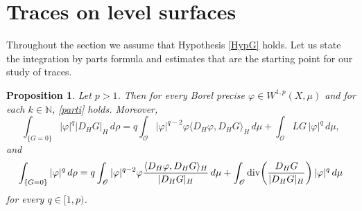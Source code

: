 \documentclass[reqno,twoside,12pt]{amsart}
\newtheorem{Proposition}[Theorem]{Proposition}
\begin{document}
\section{Traces on level surfaces}
\label{sect:traces}

Throughout the section we assume that Hypothesis \ref{HypG} holds. 
Let us state the integration by parts formula and estimates that are the starting point for our study of traces. 

 
 
\begin{Proposition}
\label{p5.1}
Let $p>1$. Then for every Borel precise  $\varphi\in W^{1,p}(X, \mu)$ and for each  $k\in {\mathbb N}$, \eqref{parti} holds. 
Moreover, 
\begin{equation}
\label{partitraccia}
  \int_{\{G=0\}} | \varphi|^q |D_HG|_H  \,d\rho  =  q   \int_{\mathcal O}  | \varphi|^{q-2}\varphi \langle D_H\varphi, D_HG\rangle_H   \,d\mu +  \int_{\mathcal O} LG \,| \varphi|^q \,d\mu , 
  \end{equation}
and 
\begin{equation}
\label{partitraccia2}
 \int_{\{G=0\}} | \varphi|^q   \,d\rho = {\displaystyle}  q   \int_{\mathcal O}  | \varphi|^{q-2}\varphi \frac{\langle D_H\varphi, D_HG\rangle_H }{|D_HG|_H }  \,d\mu + \int_{\mathcal O} {\operatorname{div}} \bigg(\frac{D_HG}{|D_HG|_H}\bigg)  \,| \varphi|^q \,d\mu 
\end{equation}
for every $q\in [1,p)$. 
\end{Proposition}
\end{document}
